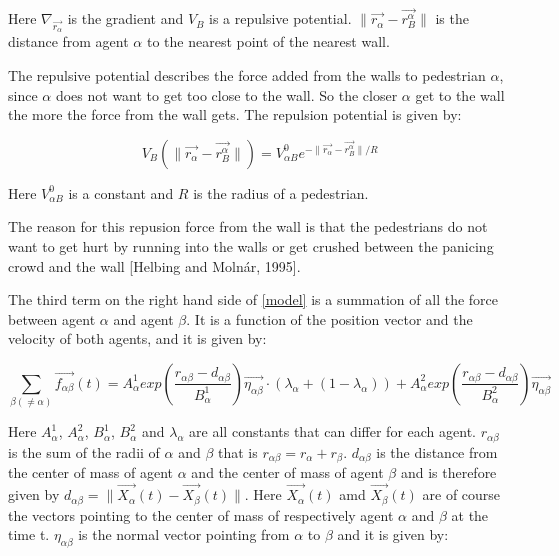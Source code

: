 Here $\nabla_{\vec{r_{\alpha}}}$ is the gradient and $V_B$ is a repulsive 
potential. $ \| \vec{r_{\alpha}} - \vec{r_{B}^{\alpha}} \|$ is the distance 
from agent $\alpha$ to the nearest point of the nearest wall.

The repulsive potential describes the force added from the walls to pedestrian $\alpha$, since $\alpha$ does not
want to get too close to the wall. So the closer $\alpha$ get to the wall the more the force from the wall gets.
The repulsion potential is given by:

\begin{equation}
V_{B} \left( \| \vec{r_{\alpha}} - \vec{r_{B}^{\alpha}} \| \right) =
V^0_{\alpha B} e^{- \| \vec{r_{\alpha}} - \vec{r_{B}^{\alpha}} \| / R }
\end{equation}

Here $V^0_{\alpha B}$ is a constant and $R$ is the radius of a pedestrian.

The reason for this repusion force from the wall is that the pedestrians do not want to get hurt by running into the walls
or get crushed between the panicing crowd and the wall [Helbing and Molnár, 1995].

The third term on the right hand side of \eqref{model} is a summation of all the 
force between agent $\alpha$ and agent $\beta$. It is a function of the position vector and the velocity of 
both agents, and it is given by:

\begin{equation}
    \sum_{\beta \left( \neq \alpha \right)}
        \vec{f_{\alpha \beta }}\left( t \right) =
        A_{\alpha}^{1} exp \left(
            \frac{ r_{\alpha \beta} - d_{\alpha \beta }}
                 {B_{\alpha}^1}
        \right)
    \vec{\eta_{\alpha \beta}} \cdot
    \left(
        \lambda_{\alpha} + \left(
            1 - \lambda_{\alpha}
        \right)
    \right) +
    A_{\alpha}^{2} exp\left(
        \frac{r_{\alpha \beta} - d_{\alpha \beta}}
             {B_{\alpha}^{2}}
    \right)
    \vec{\eta_{\alpha \beta}}
    \label{agentinteraction}
\end{equation}

Here $A_{\alpha}^{1}$, $A_{\alpha}^{2}$, $B_{\alpha}^{1}$, $B_{\alpha}^{2}$ 
and $\lambda_{\alpha}$ are all constants that can differ for each agent. 
$r_{\alpha \beta}$ is the sum of the radii of $\alpha$ and $\beta$ that is 
$r_{\alpha \beta} = r_{\alpha} + r_{\beta}$. $d_{\alpha \beta}$ is the 
distance from the center of mass of agent $\alpha$ and the center of mass of 
agent $\beta$ and is therefore given by $d_{\alpha \beta} = 
\|\vec{X_{\alpha}}\left( t \right) - \vec{X_{\beta}}\left( t \right) \|$. Here 
$\vec{X_{\alpha}}\left( t \right)$ amd $\vec{X_{\beta}}\left( t \right)$ are 
of course the vectors pointing to the center of mass of respectively agent 
$\alpha$ and $\beta$ at the time t. $\eta_{\alpha \beta}$ is the normal vector 
pointing from $\alpha$ to $\beta$ and it is given by:

